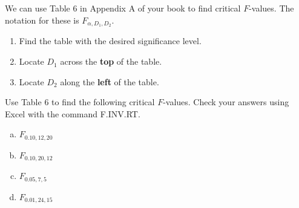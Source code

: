 \documentclass[12pt, letterpaper]{article}
\newcounter{exercise}
\theoremstyle{definition}
\begin{document}
\noindent We can use Table 6 in Appendix A of your book to find critical $F$-values.  The notation for these is $F_{\alpha,D_1,D_2}$.

\begin{enumerate}

\item Find the table with the desired significance level.

\item Locate $D_1$ across the \textbf{top} of the table.

\item Locate $D_2$ along the \textbf{left} of the table.

\end{enumerate}


\begin{exercise}

Use Table 6 to find the following critical $F$-values.  Check your answers using Excel with the command F.INV.RT.

\end{exercise}

\begin{enumerate}[(a)]

\item $F_{0.10,12,20}$
\vfill

\item $F_{0.10,20,12}$
\vfill

\item $F_{0.05,7,5}$
\vfill

\item $F_{0.01,24,15}$
\vfill

\end{enumerate}

\newpage
\end{document}
